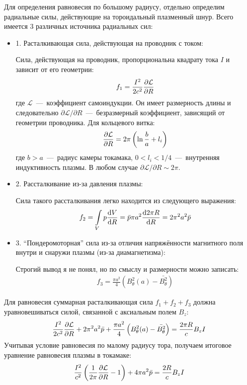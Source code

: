 \documentclass[10pt, a4paper]{article}
\begin{document}
Для определения равновесия по большому радиусу, отдельно определим радиальные силы, действующие на тороидальный плазменный шнур. Всего имеется 3 различных источника радиальных сил:
\begin{itemize}
   \item 1. Расталкивающая сила, действующая на проводник с током:

   Сила, действующая на проводник, пропорциональна квадрату тока $I$ и зависит от его геометрии:
   \begin{align*}
      f_1 = \frac{I^2}{2c^2} \pdv{\mathcal{L}}{R}
   \end{align*}
   где $\mathcal{L}$~---~коэффициент самоиндукции. Он имеет размерность длины и следовательно $\partial\mathcal{L}/\partial R$~---~безразмерный коэффициент, зависящий от геометрии проводника. Для кольцевого витка:
   \begin{equation*}
      \pdv{\mathcal{L}}{R} = 2\pi \left( \ln\frac{b}{a} + l_i \right)
   \end{equation*}
   где $b>a$~---~радиус камеры токамака, $0<l_i<1/4$~---~внутренняя индуктивность плазмы. В любом случае $\partial\mathcal{L}/\partial R\sim 2\pi$.

   \item 2. Рассталкивание из-за давления плазмы:
   
   Сила такого рассталкивания легко находится из следующего выражения:
   \begin{align*}
      f_2 = \int\limits_{V} p \dv{V}{R} = \bar{p} \pi a^2 \dv{2\pi R}{R} = 2\pi^2 a^2 \bar{p}
   \end{align*}

   \item 3. ``Пондеромоторная'' сила из-за отличия напряжённости магнитного поля внутри и снаружи  плазмы (из-за диамагнетизма):
   
   Строгий вывод я не понял, но по смыслу и размерности можно записать:
   \begin{align*}
      f_3 = \frac{\pi a^2}{4}\left( B_\theta^2(a) - \bar{B_\theta^2} \right)
   \end{align*}
\end{itemize}

Для равновесия суммарная расталкивающая сила $f_1+f_2+f_3$ должна уравновешиваться силой, связанной с аксиальным полем $B_z$:
\begin{equation*}
   \frac{I^2}{2c^2} \pdv{\mathcal{L}}{R} + 2\pi^2 a^2 \bar{p} + \frac{\pi a^2}{4}\left( B_\theta^2(a) - \bar{B_\theta^2} \right) = \frac{2\pi R}{c} B_z I
\end{equation*}
Учитывая условие равновесия по малому радиусу тора, получаем итоговое уравнение равновесия плазмы в токамаке:
\begin{align*}
   \frac{I^2}{c^2} \left( \frac{1}{2\pi}\pdv{\mathcal{L}}{R} - 1 \right) + 4\pi a^2 \bar{p} = \frac{2 R}{c} B_z I
\end{align*}
\end{document}
